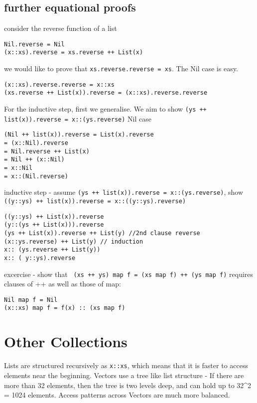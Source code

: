 \subsection{ further equational proofs}

consider the reverse function of a list

\begin{lstlisting}
Nil.reverse = Nil
(x::xs).reverse = xs.reverse ++ List(x)
\end{lstlisting}

we would like to prove that \lstinline|xs.reverse.reverse = xs|. The Nil case is easy. 
\begin{lstlisting}
(x::xs).reverse.reverse = x::xs
(xs.reverse ++ List(x)).reverse = (x::xs).reverse.reverse
\end{lstlisting}

For the inductive step, first we generalise. We aim to show \lstinline|(ys ++ list(x)).reverse = x::(ys.reverse)|
Nil case
\begin{lstlisting}
(Nil ++ list(x)).reverse = List(x).reverse 
= (x::Nil).reverse 
= Nil.reverse ++ List(x)
= Nil ++ (x::Nil)
= x::Nil
= x::(Nil.reverse)
\end{lstlisting}

inductive step - assume \lstinline|(ys ++ list(x)).reverse = x::(ys.reverse)|, show \lstinline|((y::ys) ++ list(x)).reverse = x::((y::ys).reverse)|

\begin{lstlisting}
((y::ys) ++ List(x)).reverse
(y::(ys ++ List(x))).reverse
(ys ++ List(x)).reverse ++ List(y) //2nd clause reverse
(x::ys.reverse) ++ List(y) // induction
x:: (ys.reverse ++ List(y))
x:: ( y::ys).reverse
\end{lstlisting}


excercise - show that \lstinline| (xs ++ ys) map f = (xs map f) ++ (ys map f)|
requires clauses of ++ as well as those of map:
\begin{lstlisting}
Nil map f = Nil
(x::xs) map f = f(x) :: (xs map f)
\end{lstlisting}

\section{ Other Collections}

Lists are structured recursively as \lstinline|x::xs|, which means that it is faster to access elements near the beginning. Vectors use a tree like list structure - If there are more than 32 elements, then the tree is two levels deep, and can hold up to 32^2 = 1024 elements. Access patterns across Vectors are much more balanced.

